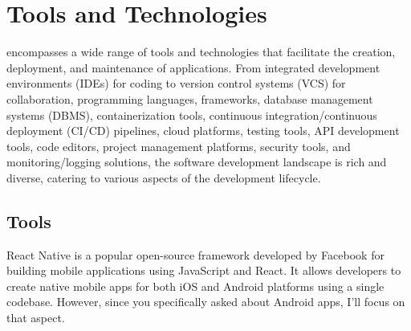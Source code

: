 \chapter{Tools and Technologies}

\justify
{\myprojectname} encompasses a wide range of tools and technologies that facilitate the creation, deployment, and maintenance of applications. From integrated development environments (IDEs) for coding to version control systems (VCS) for collaboration, programming languages, frameworks, database management systems (DBMS), containerization tools, continuous integration/continuous deployment (CI/CD) pipelines, cloud platforms, testing tools, API development tools, code editors, project management platforms, security tools, and monitoring/logging solutions, the software development landscape is rich and diverse, catering to various aspects of the development lifecycle.
\section{Tools}
\justify

React Native is a popular open-source framework developed by Facebook for building mobile applications using JavaScript and React. It allows developers to create native mobile apps for both iOS and Android platforms using a single codebase. However, since you specifically asked about Android apps, I'll focus on that aspect.


